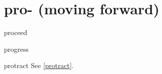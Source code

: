 \chapter{pro- (moving forward)}

\begin{word}{proceed}
\end{word}

\begin{word}{progress}
\end{word}

\begin{word}{protract}
    See \ref{protract}.
\end{word}